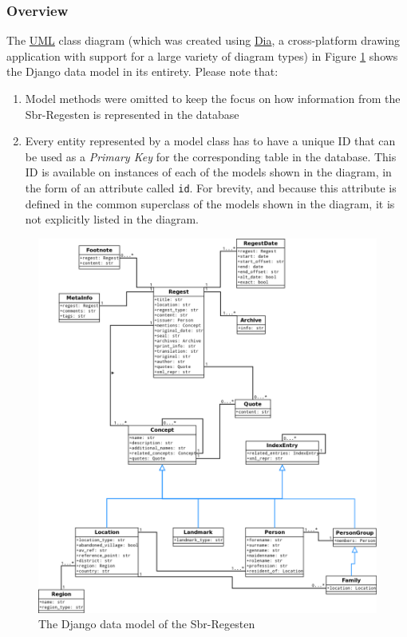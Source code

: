 \subsubsection{Overview}
\label{sec:model-overview}

The
\href{https://en.wikipedia.org/wiki/Unified_Modeling_Language}{UML}
class diagram (which was created using
\href{http://projects.gnome.org/dia/}{Dia}, a cross-platform drawing
application with support for a large variety of diagram types) in
Figure \ref{fig:data-model} shows the Django data model in its
entirety. Please note that:

\begin{enumerate}
\item Model methods were omitted to keep the focus on how information
  from the Sbr-Regesten is represented in the database
\item Every entity represented by a model class has to have a unique
  ID that can be used as a \emph{Primary Key} for the corresponding
  table in the database. This ID is available on instances of each of
  the models shown in the diagram, in the form of an attribute called
  \texttt{id}. For brevity, and because this attribute is defined in
  the common superclass of the models shown in the diagram, it is not
  explicitly listed in the diagram.
\end{enumerate}

\begin{figure}[h]
  \centering
  \includegraphics[scale=0.3]{img/data-model}
  \caption{The Django data model of the Sbr-Regesten}
  \label{fig:data-model}
\end{figure}

